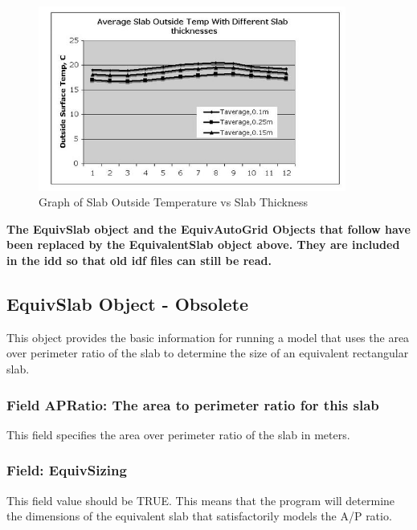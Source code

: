 \begin{figure}[hbtp] %
\centering
\includegraphics[width=0.9\textwidth, height=0.9\textheight, keepaspectratio=true]{media/image019.jpg}
\caption{Graph of Slab Outside Temperature vs Slab Thickness \protect \label{fig:graph-of-slab-outside-temperature-vs-slab}}
\end{figure}

\textbf{The EquivSlab object and the EquivAutoGrid Objects that follow have been replaced by the EquivalentSlab object above. They are included in the idd so that old idf files can still be read.}

\subsection{EquivSlab Object - Obsolete}\label{equivslab-object---obsolete}

This object provides the basic information for running a model that uses the area over perimeter ratio of the slab to determine the size of an equivalent rectangular slab.

\subsubsection{Field APRatio: The area to perimeter ratio for this slab}\label{field-apratio-the-area-to-perimeter-ratio-for-this-slab-1}

This field specifies the area over perimeter ratio of the slab in meters.

\subsubsection{Field: EquivSizing}\label{field-equivsizing}

This field value should be TRUE. This means that the program will determine the dimensions of the equivalent slab that satisfactorily models the A/P ratio.

